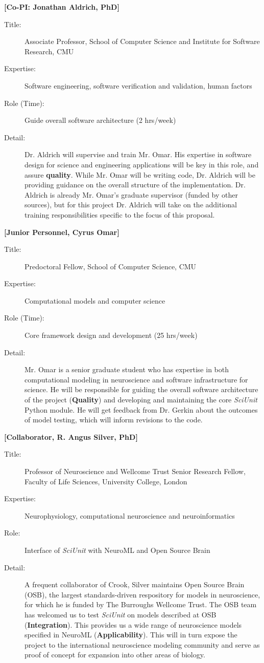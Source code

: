 \documentclass[11pt,letterpaper]{article}
\begin{document}
\textbf{[Co-PI: Jonathan Aldrich, PhD]}
\begin{description}
\item[Title:] Associate Professor, School of Computer Science and Institute for Software Research, CMU
\item[Expertise:] Software engineering, software verification and validation, human factors
\item[Role (Time):] Guide overall software architecture (2 hrs/week)
\item[Detail:] Dr. Aldrich will supervise and train Mr. Omar.  His expertise in software design for science and engineering applications will be key in this role, and assure \textbf{quality}.  While Mr. Omar will be writing code, Dr. Aldrich will be providing guidance on the overall structure of the implementation.  Dr. Aldrich is already Mr. Omar's graduate supervisor (funded by other sources), but for this project Dr. Aldrich will take on the additional training responsibilities specific to the focus of this proposal.  
\end{description}
\textbf{[Junior Personnel, Cyrus Omar]}
\begin{description}
\item[Title:] Predoctoral Fellow, School of Computer Science, CMU
\item[Expertise:] Computational models and computer science 
\item[Role (Time):] Core framework design and development (25 hrs/week)
\item[Detail:] Mr. Omar is a senior graduate student who has expertise in both computational modeling in neuroscience and software infrastructure for science.  He will be responsible for guiding the overall software architecture of the project (\textbf{Quality}) and developing and maintaining the core \textit{SciUnit} Python module.  He will get feedback from Dr. Gerkin about the outcomes of model testing, which will inform revisions to the code.  
\end{description}
\textbf{[Collaborator, R. Angus Silver, PhD]}
\begin{description}
\item[Title:] Professor of Neuroscience and Wellcome Trust Senior Research Fellow, Faculty of Life Sciences, University College, London
\item[Expertise:] Neurophysiology, computational neuroscience and neuroinformatics  
\item[Role:] Interface of \textit{SciUnit} with NeuroML and Open Source Brain
\item[Detail:] A frequent collaborator of Crook, Silver maintains Open Source Brain (OSB), the largest standards-driven respository for models in neuroscience, for which he is funded by The Burroughs Wellcome Trust.  The OSB team has welcomed us to test \textit{SciUnit} on models described at OSB (\textbf{Integration}).  This provides us a wide range of neuroscience models specified in NeuroML (\textbf{Applicability}).  This will in turn expose the project to the international neuroscience modeling community and serve as proof of concept for expansion into other areas of biology.  
\end{description}
\end{document}

